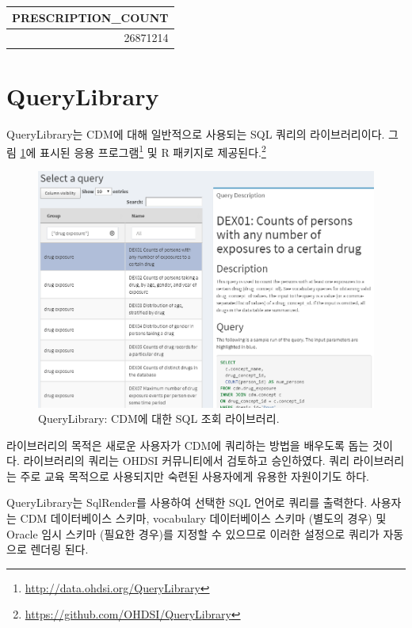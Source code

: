 \documentclass[10.5pt]{book}
\let\rmarkdownfootnote\footnote%
\def\footnote{\protect\rmarkdownfootnote}
\theoremstyle{definition}
\theoremstyle{definition}
\theoremstyle{definition}
\theoremstyle{remark}
\begin{document}
\begin{longtable}[]{@{}r@{}}
\toprule
PRESCRIPTION\_COUNT\tabularnewline
\midrule
\endhead
26871214\tabularnewline
\bottomrule
\end{longtable}

\section{QueryLibrary}\label{querylibrary}


QueryLibrary는 CDM에 대해 일반적으로 사용되는 SQL 쿼리의 라이브러리이다.
그림 \ref{fig:queryLibrary}에 표시된 응용 프로그램\footnote{\url{http://data.ohdsi.org/QueryLibrary}}
및 R 패키지로 제공된다.\footnote{\url{https://github.com/OHDSI/QueryLibrary}}

\begin{figure}

{\centering \includegraphics[width=1\linewidth]{images/SqlAndR/queryLibrary} 

}

\caption{QueryLibrary: CDM에 대한 SQL 조회 라이브러리.}\label{fig:queryLibrary}
\end{figure}

라이브러리의 목적은 새로운 사용자가 CDM에 쿼리하는 방법을 배우도록 돕는
것이다. 라이브러리의 쿼리는 OHDSI 커뮤니티에서 검토하고 승인하였다. 쿼리
라이브러리는 주로 교육 목적으로 사용되지만 숙련된 사용자에게 유용한
자원이기도 하다.

QueryLibrary는 SqlRender를 사용하여 선택한 SQL 언어로 쿼리를 출력한다.
사용자는 CDM 데이터베이스 스키마, vocabulary 데이터베이스 스키마 (별도의
경우) 및 Oracle 임시 스키마 (필요한 경우)를 지정할 수 있으므로 이러한
설정으로 쿼리가 자동으로 렌더링 된다.
\end{document}
